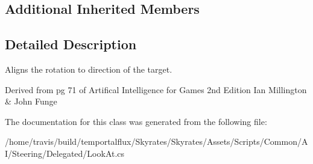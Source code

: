\subsection*{Additional Inherited Members}


\subsection{Detailed Description}
Aligns the rotation to direction of the target. 

Derived from pg 71 of Artifical Intelligence for Games 2nd Edition Ian Millington \& John Funge 

The documentation for this class was generated from the following file\-:\begin{DoxyCompactItemize}
\item 
/home/travis/build/temportalflux/\-Skyrates/\-Skyrates/\-Assets/\-Scripts/\-Common/\-A\-I/\-Steering/\-Delegated/Look\-At.\-cs\end{DoxyCompactItemize}
